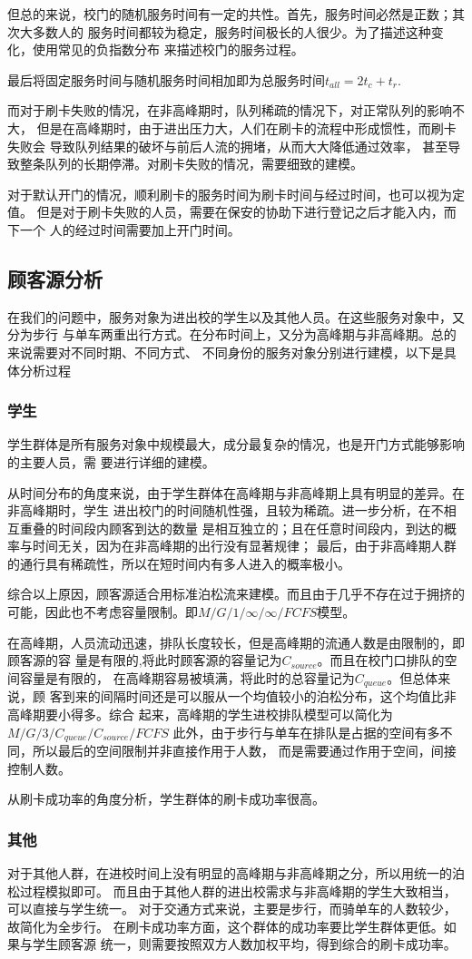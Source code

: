     但总的来说，校门的随机服务时间有一定的共性。首先，服务时间必然是正数；其次大多数人的
    服务时间都较为稳定，服务时间极长的人很少。为了描述这种变化，使用常见的负指数分布
    来描述校门的服务过程。

    最后将固定服务时间与随机服务时间相加即为总服务时间$t_{all}=2t_{c}+t_{r}$.

    而对于刷卡失败的情况，在非高峰期时，队列稀疏的情况下，对正常队列的影响不大，
    但是在高峰期时，由于进出压力大，人们在刷卡的流程中形成惯性，而刷卡失败会
    导致队列结果的破坏与前后人流的拥堵，从而大大降低通过效率，
    甚至导致整条队列的长期停滞。对刷卡失败的情况，需要细致的建模。

    对于默认开门的情况，顺利刷卡的服务时间为刷卡时间与经过时间，也可以视为定值。
    但是对于刷卡失败的人员，需要在保安的协助下进行登记之后才能入内，而下一个
    人的经过时间需要加上开门时间。

\subsection{顾客源分析}
在我们的问题中，服务对象为进出校的学生以及其他人员。在这些服务对象中，又分为步行
与单车两重出行方式。在分布时间上，又分为高峰期与非高峰期。总的来说需要对不同时期、不同方式、
不同身份的服务对象分别进行建模，以下是具体分析过程

\subsubsection{学生}
	学生群体是所有服务对象中规模最大，成分最复杂的情况，也是开门方式能够影响的主要人员，需
    要进行详细的建模。

	从时间分布的角度来说，由于学生群体在高峰期与非高峰期上具有明显的差异。在非高峰期时，学生
    进出校门的时间随机性强，且较为稀疏。进一步分析，在不相互重叠的时间段内顾客到达的数量
    是相互独立的；且在任意时间段内，到达的概率与时间无关，因为在非高峰期的出行没有显著规律；
    最后，由于非高峰期人群的通行具有稀疏性，所以在短时间内有多人进入的概率极小。
    
    综合以上原因，顾客源适合用标准泊松流来建模。而且由于几乎不存在过于拥挤的
    可能，因此也不考虑容量限制。即$M/G/1/\infty/\infty/FCFS$模型。

    在高峰期，人员流动迅速，排队长度较长，但是高峰期的流通人数是由限制的，即顾客源的容
    量是有限的,将此时顾客源的容量记为$C_{source}$。而且在校门口排队的空间容量是有限的，
    在高峰期容易被填满，将此时的总容量记为$C_{queue}$。但总体来说，顾
    客到来的间隔时间还是可以服从一个均值较小的泊松分布，这个均值比非高峰期要小得多。综合
    起来，高峰期的学生进校排队模型可以简化为$M/G/3/C_{queue}/C_{source}/FCFS$
    此外，由于步行与单车在排队是占据的空间有多不同，所以最后的空间限制并非直接作用于人数，
    而是需要通过作用于空间，间接控制人数。

    从刷卡成功率的角度分析，学生群体的刷卡成功率很高。

\subsubsection{其他}
    对于其他人群，在进校时间上没有明显的高峰期与非高峰期之分，所以用统一的泊松过程模拟即可。
    而且由于其他人群的进出校需求与非高峰期的学生大致相当，可以直接与学生统一。
    对于交通方式来说，主要是步行，而骑单车的人数较少，故简化为全步行。
    在刷卡成功率方面，这个群体的成功率要比学生群体更低。如果与学生顾客源
    统一，则需要按照双方人数加权平均，得到综合的刷卡成功率。
